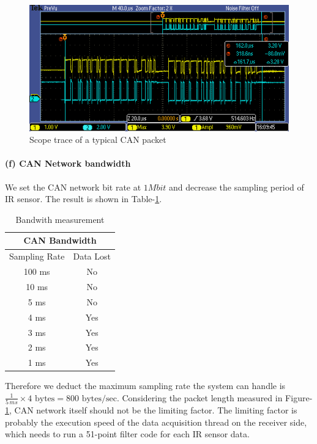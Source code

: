 \documentclass[a4paper]{article}
\newlength{\pic}
\begin{document}
\setlength{\pic}{0.8\textwidth}
\begin{figure}[htp]
\center
\includegraphics[width=\pic]{scope/CAN_packet}
\caption{Scope trace of a typical CAN packet}
\label{trace}
\end{figure}


\paragraph{(f) CAN Network bandwidth} We set the CAN network bit rate at $ 1 Mbit $ and decrease the sampling period of
IR sensor. The result is shown in Table-\ref{tab4}.

\begin{table}
\center
  \begin{tabular}{|c|c|}
    \hline
    \multicolumn{2}{|c|}{CAN Bandwidth} \\
    \hline
    Sampling Rate  & Data Lost \\
    \hline
	100 ms &   No \\
	10 ms  &   No \\
	5 ms   &   No \\
	4 ms   &   Yes \\
	3 ms   &   Yes \\
	2 ms   &   Yes \\
	1 ms   &   Yes \\
    \hline
  \end{tabular}
  \caption{Bandwith measurement}
  \label{tab4}
\end{table}

Therefore we deduct the maximum sampling rate the system can handle is $\frac{1}{5 \, ms} \times 4 \text{ bytes} = 800
 \text{ bytes/sec} $.
Considering the packet length measured in Figure-\ref{trace}, CAN network itself should not be the limiting factor.
The limiting factor is probably the execution speed of the data acquisition thread on the receiver side, which
needs to run a 51-point filter code for each IR sensor data.
\end{document}
